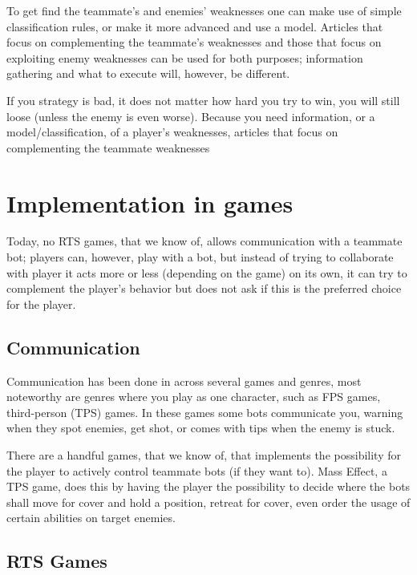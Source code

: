 To get find the teammate’s and enemies’ weaknesses one can make use of simple classification rules, or make it more advanced and use a model. Articles that focus on complementing the teammate’s weaknesses\cite{jansen07, pucheng11,houlette03} and those that focus on exploiting enemy weaknesses\cite{kabanza10, schadd07, synnaeve11} can be used for both purposes; information gathering and what to execute will, however, be different.

If you strategy is bad, it does not matter how hard you try to win, you will still loose (unless the enemy is even worse). Because you need information, or a model/classification, of a player’s weaknesses, articles that focus on complementing the teammate weaknesses

\section{Implementation in games}

Today, no RTS games, that we know of, allows communication with a teammate bot; players can, however, play with a bot, but instead of trying to collaborate with player it acts more or less (depending on the game) on its own, it can try to complement the player's behavior but does not ask if this is the preferred choice for the player.

\subsection{Communication}
\label{sec:games_communication}
Communication has been done in across several games and genres, most noteworthy are genres where you play as one character, such as FPS games, third-person (TPS) games. In these games some bots communicate you, warning when they spot enemies, get shot, or comes with tips when the enemy is stuck. 

There are a handful games, that we know of, that implements the possibility for the player to actively control teammate bots (if they want to). Mass Effect\cite{masseffect}, a TPS game, does this by having the player the possibility to decide where the bots shall move for cover and hold a position, retreat for cover, even order the usage of certain abilities on target enemies.

\subsection{RTS Games}
